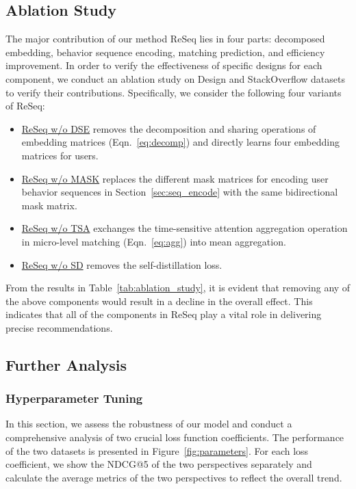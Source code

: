 \subsection{Ablation Study}
The major contribution of our method ReSeq lies in four parts: decomposed embedding, behavior sequence encoding, matching prediction, and efficiency improvement. 
In order to verify the effectiveness of specific designs for each component, we conduct an ablation study on Design and StackOverflow datasets to verify their contributions. 
Specifically, we consider the following four variants of ReSeq:
\begin{itemize}
\item {\underline{ReSeq w/o DSE}} removes the decomposition and sharing operations of embedding matrices (Eqn.~\eqref{eq:decomp}) and directly learns four embedding matrices for users.
\item {\underline{ReSeq w/o MASK}} 
replaces the different mask matrices for encoding user behavior sequences in Section~\ref{sec:seq_encode} with the same bidirectional mask matrix.
\item {\underline{ReSeq w/o TSA}} exchanges the time-sensitive attention aggregation operation in micro-level matching (Eqn.~\eqref{eq:agg}) into mean aggregation.
\item {\underline{ReSeq w/o SD}}  removes the self-distillation loss.
\end{itemize}

From the results in Table~\ref{tab:ablation_study}, it is evident that removing any of the above components would result in a decline in the overall effect. This indicates that all of the components in ReSeq play a vital role in delivering precise recommendations.


\subsection{Further Analysis}
\subsubsection{Hyperparameter Tuning}
In this section, we assess the robustness of our model and conduct a comprehensive analysis of two crucial loss function coefficients. The performance of the two datasets is presented in Figure~\ref{fig:parameters}. 
For each loss coefficient, we show the NDCG@5 of the two perspectives separately and calculate the average metrics of the two perspectives to reflect the overall trend.


